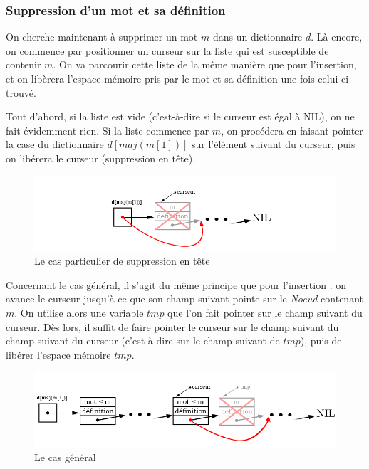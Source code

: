 \documentclass[a4paper, titlepage]{livret} %
\begin{document}
				\subsubsection{Suppression d'un mot et sa définition}
					On cherche maintenant à supprimer un mot $m$ dans un dictionnaire $d$.
					Là encore, on commence par positionner un curseur sur la liste qui est susceptible de contenir $m$.
					On va parcourir cette liste de la même manière que pour l'insertion, et on libèrera l'espace mémoire pris par le mot et sa définition une fois celui-ci trouvé.

					Tout d'abord, si la liste est vide (c'est-à-dire si le curseur est égal à NIL), on ne fait évidemment rien.
					Si la liste commence par $m$, on procédera en faisant pointer la case du dictionnaire $d[maj(m[1])]$ sur l'élément suivant du curseur, puis on libérera le curseur (suppression en tête).
					\begin{figure}[!ht]
					\centering
  						\includegraphics[scale=0.45]{supprimer1.png}
  						\caption{Le cas particulier de suppression en tête} 
					\end{figure}
					\newpage

					Concernant le cas général, il s'agit du même principe que pour l'insertion : on avance le curseur jusqu'à ce que son champ suivant pointe sur le \textit{Noeud} contenant $m$.
					On utilise alors une variable $tmp$ que l'on fait pointer sur le champ suivant du curseur.
					Dès lors, il suffit de faire pointer le curseur sur le champ suivant du champ suivant du curseur (c'est-à-dire sur le champ suivant de $tmp$), puis de libérer l'espace mémoire $tmp$.
					\begin{figure}[!ht]
					\centering
  						\includegraphics[scale=0.45]{supprimer2.png}
  						\caption{Le cas général} 
					\end{figure}
\end{document}

